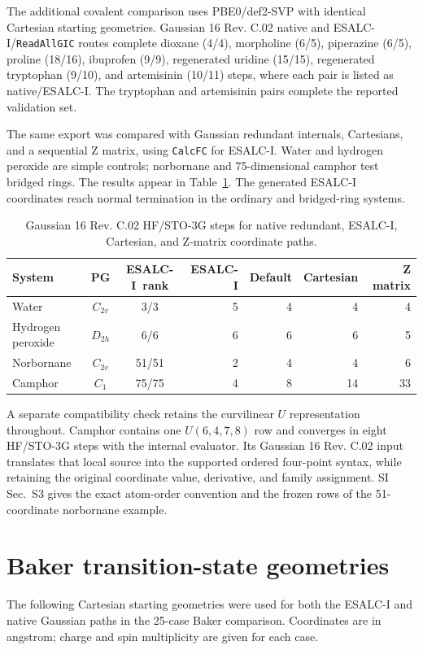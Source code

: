 \documentclass[10pt]{article}
\newcommand{\ESALCI}{ESALC-I}
\begin{document}
{The additional covalent comparison uses PBE0/def2-SVP with identical Cartesian
starting geometries.  Gaussian 16 Rev. C.02 native and ESALC-I/\texttt{ReadAllGIC} routes
complete dioxane (4/4), morpholine (6/5), piperazine (6/5), proline (18/16),
ibuprofen (9/9), regenerated uridine (15/15), regenerated tryptophan (9/10),
and artemisinin (10/11) steps, where each pair is listed as native/ESALC-I.
The tryptophan and artemisinin pairs complete the reported
{validation set}.


The same export was compared with Gaussian redundant internals, Cartesians, and
a sequential Z matrix, using \texttt{CalcFC} for ESALC-I.  Water and hydrogen
peroxide are simple controls; norbornane and 75-dimensional camphor test bridged
rings.  The results appear in
Table~\ref{tab:gaussian-coordinate-comparison}. The generated ESALC-I coordinates
reach normal termination in the ordinary and bridged-ring systems.

\begin{table}[htbp]
\centering
\caption{{Gaussian 16 Rev. C.02 HF/STO-3G steps for native redundant,
ESALC-I, Cartesian, and Z-matrix coordinate paths.}}
\label{tab:gaussian-coordinate-comparison}
\begin{tabular}{lccrrrr}
\toprule
System & PG & \ESALCI\ rank & \ESALCI & Default & Cartesian & Z matrix \\
\midrule
Water & \(C_{2v}\) & 3/3 & 5 & 4 & 4 & 4 \\
Hydrogen peroxide & \(D_{2h}\) & 6/6 & 6 & 6 & 6 & 5 \\
Norbornane & \(C_{2v}\) & 51/51 & 2 & 4 & 4 & 6 \\
Camphor & \(C_1\) & 75/75 & 4 & 8 & 14 & 33 \\
\bottomrule
\end{tabular}
\end{table}

A separate compatibility check retains the curvilinear \(U\) representation
throughout.  Camphor contains one \(U(6,4,7,8)\) row and converges in eight
HF/STO-3G steps with the internal evaluator.  Its Gaussian 16 Rev. C.02 input translates
that local source into the supported ordered four-point syntax, while retaining
the original coordinate value, derivative, and family assignment.  SI
Sec.~S3 gives the exact atom-order convention and the frozen rows of the
51-coordinate norbornane example.


\section{Baker transition-state geometries}
\label{sec:baker-geometries}
The following Cartesian starting geometries were used for both the ESALC-I and native Gaussian paths in the 25-case Baker comparison.\cite{BakerChan1996TS} Coordinates are in angstrom; charge and spin multiplicity are given for each case.
}
\end{document}

